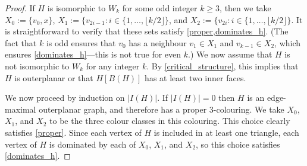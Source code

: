 \documentclass{article}
\theoremstyle{definition}
\begin{document}
\begin{proof}
  If $H$ is isomorphic to $W_k$ for some odd integer $k\ge 3$, then we take $X_0:=\{v_0, x\}$, $X_1:=\{v_{2i-1}:i\in\{1,\ldots,\lfloor k/2\rfloor\}$, and $X_2:=\{v_{2i}:i\in\{1,\ldots,\lfloor k/2\rfloor\}$.  It is straightforward to verify that these sets satisfy \cref{proper,dominates_h}.  (The fact that $k$ is odd ensures that $v_0$ has a neighbour $v_1\in X_1$ and $v_{k-1}\in X_2$, which ensures \cref{dominates_h}---this is not true for even $k$.)   We now assume that $H$ is not isomorphic to $W_k$ for any integer $k$.  By \cref{critical_structure}, this implies that $H$ is outerplanar or that $H[B(H)]$ has at least two inner faces.

  We now proceed by induction on $|I(H)|$.  If $|I(H)|=0$ then $H$ is an edge-maximal outerplanar graph, and therefore has a proper $3$-colouring.  We take $X_0$, $X_1$, and $X_2$ to be the three colour classes in this colouring.  This choice clearly satisfies \cref{proper}. Since each vertex of $H$ is included in at least one triangle, each vertex of $H$ is dominated by each of $X_0$, $X_1$, and $X_2$, so this choice satisfies \cref{dominates_h}.


\end{proof}
\end{document}
